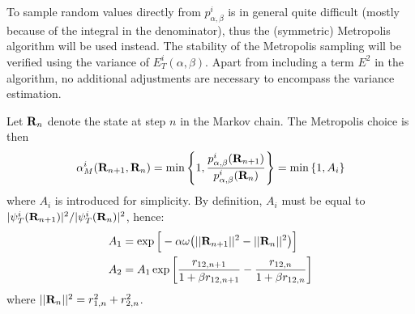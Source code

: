 \documentclass[nofootinbib,reprint,english]{revtex4-1}
\begin{document}
To sample random values directly from \(p_{\alpha,\beta}^i\) is in general quite difficult (mostly because of the integral in the denominator), thus the (symmetric) Metropolis algorithm will be used instead. The stability of the Metropolis sampling will be verified using the variance of \(E_T^i(\alpha,\beta)\). Apart from including a term \(E^2\) in the algorithm, no additional adjustments are necessary to encompass the variance estimation.

Let \(\vb{R}_n\) denote the state at step \(n\) in the Markov chain. The Metropolis choice is then
\begin{equation*}
\alpha_M^i(\vb{R}_{n+1},\vb{R}_n)=\min\left\lbrace1,\frac{p_{\alpha,\beta}^i(\vb{R}_{n+1})}{p_{\alpha,\beta}^i(\vb{R}_n)}\right\rbrace=\min\left\lbrace1,A_i\right\rbrace
\end{equation*}
where \(A_i\) is introduced for simplicity. By definition, \(A_i\) must be equal to \(|\psi_T^i(\vb{R}_{n+1})|^2/|\psi_T^i(\vb{R}_n)|^2\), hence:
\begin{subequations}\label{eq:VMC_probability_ratios}
\begin{align}
A_1&=\exp\Big[-\alpha\omega\big(||\vb{R}_{n+1}||^2-||\vb{R}_n||^2\big)\Big]\\
A_2&=A_1\exp\bigg[\frac{r_{12,n+1}}{1+\beta r_{12,n+1}}-\frac{r_{12,n}}{1+\beta r_{12,n}}\bigg]
\end{align}
\end{subequations}
where \(||\vb{R}_n||^2=r_{1,n}^2+r_{2,n}^2\).
\end{document}
